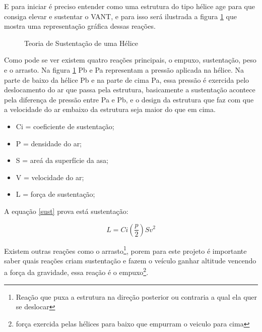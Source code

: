 E para iniciar é preciso entender como uma estrutura do tipo hélice age para que consiga elevar e sustentar o VANT, e para isso será ilustrada a figura \ref{fig:asa} que mostra uma representação gráfica dessas reações. 

\begin{figure}[H]
	\centering
	\caption{Teoria de Sustentação de uma Hélice}
	\fontsize{9pt}{12pt}\selectfont
	\def\svgwidth{13cm}
	
	\label{fig:asa}
\end{figure}

Como pode se ver existem quatro reações principais, o empuxo, sustentação, peso e o arrasto. Na figura \ref{fig:asa} Pb e Pa representam a pressão aplicada na hélice. Na  parte de baixo da hélice Pb e na parte de cima Pa, essa pressão é exercida pelo deslocamento do ar que passa pela estrutura, basicamente a sustentação acontece pela diferença de pressão entre Pa e Pb, e o design da estrutura que faz com que a velocidade do ar embaixo da estrutura seja maior do que em cima.

\begin{itemize}
    \item Ci = coeficiente de sustentação;
    \item P = densidade do ar; 
    \item S = areá da superfície da asa;
    \item V = velocidade do ar; 
    \item L = força de sustentação;
\end{itemize}{}
A equação \ref{sust} prova está sustentação: 

\begin{equation}
    \label{sust}
    L=Ci\left(\frac{p}{2}\right)Sv^2
\end{equation}

Existem outras reações como o arrasto\footnote{Reação que puxa a estrutura na direção posterior ou contraria a qual ela quer se deslocar}, porem para este projeto é importante saber quais reações criam sustentação e fazem o veículo ganhar altitude vencendo a força da gravidade, essa reação é o empuxo\footnote{força exercida pelas hélices para baixo que empurram o veiculo para cima}\cite{inproceedings}.

